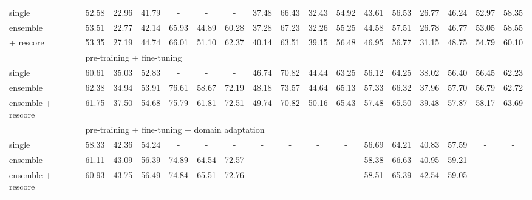 \documentclass[11pt]{article}
\begin{document}
\begin{table}[H]
\begin{tabular}{@{\extracolsep{2.5pt}}l ccc ccc|c ccc|cccc|cc@{}}
		single
		& 52.58 & 22.96 & 41.79 
		& - & - & - 
		& 37.48 & 66.43 & 32.43 & 54.92 
		& 43.61 & 56.53 & 26.77 & 46.24 
		& 52.97 & 58.35 \\
		ensemble
		& 53.51 & 22.77 & 42.14 
		& 65.93 & 44.89 & 60.28 
		& 37.28 & 67.23 & 32.26 & 55.25 
		& 44.58 & 57.51 & 26.78 & 46.77 
		& 53.05 & 58.55 \\
		+ rescore
		& 53.35 & 27.19 & 44.74 
		& 66.01 & 51.10 & 62.37 
		& 40.14 & 63.51 & 39.15 & 56.48 
		& 46.95 & 56.77 & 31.15 & 48.75 
		& 54.79 & 60.10 \\
		\hline
		& \multicolumn{16}{l}{pre-training + fine-tuning} \\
		single
		& 60.61 & 35.03 & 52.83 
		& - & - & - 
		& 46.74 & 70.82 & 44.44 & 63.25 
		& 56.12 & 64.25 & 38.02 & 56.40 
		& 56.45 & 62.23 \\
		ensemble
		& 62.38 & 34.94 & 53.91 
		& 76.61 & 58.67 & 72.19 
		& 48.18 & 73.57 & 44.64 & 65.13 
		& 57.33 & 66.32 & 37.96 & 57.70 
		& 56.79 & 62.72 \\
		ensemble + rescore
		& 61.75 & 37.50 & 54.68 
		& 75.79 & 61.81 & 72.51 
		& \underline{49.74} & 70.82 & 50.16 & \underline{65.43} 
		& 57.48 & 65.50 & 39.48 & 57.87 
		& \underline{58.17} & \underline{63.69} \\
		\hline
		& \multicolumn{16}{l}{pre-training + fine-tuning + domain adaptation} \\
		single
		& 58.33 & 42.36 & 54.24 
		& - & - & - 
		& - & - & - & -
		& 56.69 & 64.21 & 40.83 & 57.59 
		& - & - \\
		ensemble
		& 61.11 & 43.09 & 56.39 
		& 74.89 & 64.54 & 72.57 
		& - & - & - & -
		& 58.38 & 66.63 & 40.95 & 59.21 
		& - & - \\
		ensemble + rescore
		& 60.93 & 43.75 & \underline{56.49} 
		& 74.84 & 65.51 & \underline{72.76} 
		& - & - & - & -
		& \underline{58.51} & 65.39 & 42.54 & \underline{59.05} 
		& - & - \\
		\hline
	\end{tabular}
\end{table}
\end{document}
